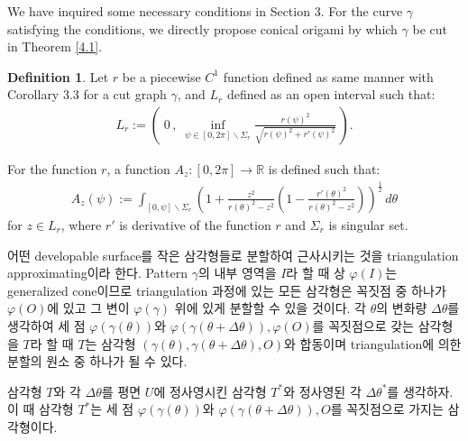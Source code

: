 \documentclass{amsart}
\theoremstyle{plain}
\theoremstyle{definition}
\newtheorem*{definition}{Definition}
\theoremstyle{remark}
\begin{document}
We have inquired some necessary conditions in Section 3.
For the curve $\gamma$ satisfying the conditions, we directly propose conical origami by which $\gamma$ be cut in Theorem \ref{4.1}.


\begin{definition}%
Let $r$ be a piecewise $C^1$ function defined as same manner with Corollary 3.3 for a cut graph $\gamma$, and $L_r$ defined as an open interval such that:
\begin{align*}
L_r:=\left(\;0\,,\;\inf_{\psi\in[0,2\pi]\backslash\Sigma_r}\frac{r(\psi)^2}{\sqrt{r(\psi)^2+r'(\psi)^2}}\,\right).
\end{align*}

For the function $r$, a function $A_z:[0,2\pi]\to{\mathbb R}$ is defined such that: 
\begin{align*}
A_z(\psi):=\int_{[0,\psi]\backslash\Sigma_r}\left(1+\frac{z^2}{r(\theta)^2 -z^2}\left(1-\frac{r'(\theta)^2}{r(\theta)^2 -z^2}\right)\right)^{\frac12}\,d\theta
\end{align*}
for $z\in L_r$, where $r'$ is derivative of the function $r$ and $\Sigma_r$ is singular set.
\end{definition}




\iffalse
어떤 developable surface를 작은 삼각형들로 분할하여 근사시키는 것을 triangulation approximating이라 한다.
Pattern $\gamma$의 내부 영역을 $I$라 할 때 상 $\varphi(I)$는 generalized cone이므로 triangulation 과정에 있는 모든 삼각형은 꼭짓점 중 하나가 $\varphi(O)$에 있고 그 변이 $\varphi(\gamma)$ 위에 있게 분할할 수 있을 것이다.
각 $\theta$의 변화량 $\Delta\theta$를 생각하여 세 점 $\varphi(\gamma(\theta))$와 $\varphi(\gamma(\theta+\Delta\theta)), \varphi(O)$를 꼭짓점으로 갖는 삼각형을 $T$라 할 때 $T$는 삼각형 $(\gamma(\theta), \gamma(\theta+\Delta\theta), O)$와 합동이며 triangulation에 의한 분할의 원소 중 하나가 될 수 있다.

삼각형 $T$와 각 $\Delta\theta$를 평면 $U$에 정사영시킨 삼각형 $T^*$와 정사영된 각 $\Delta\theta^*$를 생각하자.
이 때 삼각형 $T^*$는 세 점 $\varphi(\gamma(\theta))$와 $\varphi(\gamma(\theta+\Delta\theta)), O$를 꼭짓점으로 가지는 삼각형이다.
\end{document}
